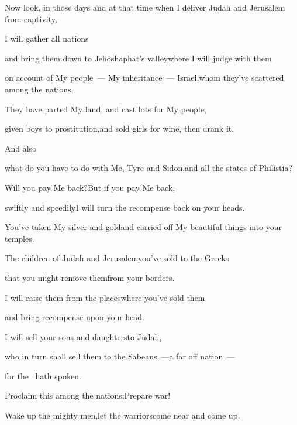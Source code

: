 
\begin{inparaenum}
  \pa{} Now look, in those days and at that time when I deliver Judah and Jerusalem from captivity,%

  \pa{} I will  gather all nations%

  \pa{}and bring them down to Jehoshaphat's valley\pa{}where I will judge with them%

  \pa{}on account of My people~--- My inheritance~--- Israel,\pa{}whom they've scattered among the nations.%

  \pa{}They have parted My land,  and cast lots for My people,%

  \pa{}given boys to prostitution,\pa{}and sold girls for wine, then drank it.%

  \pa{} And also%

  \pb{}what do you have to do with Me, Tyre and Sidon,\pa{}and all the states of Philistia?%

  \pb{}Will you pay Me back?\pa{}But if you pay Me back,%

  \pb{}swiftly and speedily\pa{}I will turn the recompense back on your heads.%

  \pb{} You've taken My silver and gold\pa{}and carried off My beautiful things into your temples.%

  \pb{} The children of Judah and Jerusalem\pa{}you've sold to the Greeks%

  \pb{}that you might remove them\pa{}from your borders.%

  \pb{} I will raise them from the places\pa{}where you've sold them%

  \pb{}and bring recompense upon your head.%

  \pb{} I will sell your sons and daughters\pa{}to Judah,%

  \pb{}who in turn shall sell them to the Sabeans~---\pa{}a far off nation~---%

  \pd{}for the \lord\ hath spoken.%

  \pb{} Proclaim this among the nations:\pa{}Prepare war!%

  \pa{}Wake up the mighty men,\pa{}let the warriors\pa{}come near and come up.%


\end{inparaenum}
